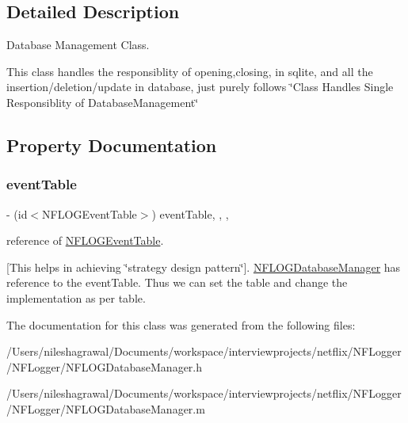 \subsection{Detailed Description}
Database Management Class. 

This class handles the responsiblity of opening,closing, in sqlite, and all the insertion/deletion/update in database, just purely follows \char`\"{}\+Class Handles Single Responsiblity of Database\+Management\char`\"{} 

\subsection{Property Documentation}
\mbox{\label{interface_n_f_l_o_g_database_manager_a0c2d72e86efb3d5b8eccef89af7b5662}} 
\subsubsection{\texorpdfstring{event\+Table}{eventTable}}
{\footnotesize\ttfamily -\/ (id$<$N\+F\+L\+O\+G\+Event\+Table$>$) event\+Table\hspace{0.3cm}{\ttfamily [read]}, {\ttfamily [write]}, {\ttfamily [nonatomic]}, {\ttfamily [strong]}}



reference of \hyperlink{class_n_f_l_o_g_event_table-p}{N\+F\+L\+O\+G\+Event\+Table}. 

\mbox{[}This helps in achieving \char`\"{}strategy design pattern\char`\"{}\mbox{]}. \hyperlink{interface_n_f_l_o_g_database_manager}{N\+F\+L\+O\+G\+Database\+Manager} has reference to the event\+Table. Thus we can set the table and change the implementation as per table. 

The documentation for this class was generated from the following files\+:\begin{DoxyCompactItemize}
\item 
/\+Users/nileshagrawal/\+Documents/workspace/interviewprojects/netflix/\+N\+F\+Logger/\+N\+F\+Logger/N\+F\+L\+O\+G\+Database\+Manager.\+h\item 
/\+Users/nileshagrawal/\+Documents/workspace/interviewprojects/netflix/\+N\+F\+Logger/\+N\+F\+Logger/N\+F\+L\+O\+G\+Database\+Manager.\+m\end{DoxyCompactItemize}
